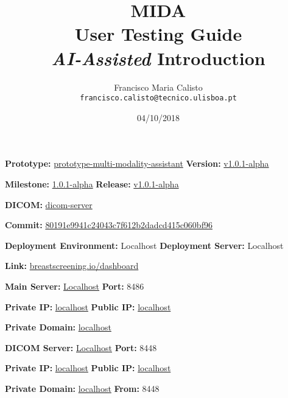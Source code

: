\documentclass{article}
\title{
MIDA
\\
User Testing Guide
\\
\textit{AI-Assisted} Introduction
}
\author{
Francisco Maria Calisto\\
\texttt{francisco.calisto@tecnico.ulisboa.pt}
}
\date{04/10/2018}
\begin{document}
\maketitle

\textbf{Prototype:} \hyperlink{https://github.com/mida-project/prototype-multi-modality-assistant}{prototype-multi-modality-assistant} \hfill \textbf{Version:} \hyperlink{https://github.com/mida-project/prototype-multi-modality-assistant/tree/9a912aea8d156f53e846b15bb29a09fc046bd731}{v1.0.1-alpha}

\textbf{Milestone:} \hyperlink{https://github.com/mida-project/prototype-multi-modality-assistant/milestone/1}{1.0.1-alpha} \hfill \textbf{Release:} \hyperlink{https://github.com/mida-project/prototype-multi-modality-assistant/releases/tag/v1.0.1-alpha}{v1.0.1-alpha}

\hfill

\textbf{DICOM:} \hyperlink{https://github.com/MIMBCD-UI/dicom-server}{dicom-server}

\textbf{Commit:} \hyperlink{https://github.com/MIMBCD-UI/dicom-server/tree/80191e9941c24043c7f612b2dadcd415c060bf96}{80191e9941c24043c7f612b2dadcd415c060bf96}

\hfill

\textbf{Deployment Environment:} Localhost \hfill \textbf{Deployment Server:} Localhost

\textbf{Link:} \hyperlink{http://www.breastscreening.io/dashboard/}{breastscreening.io/dashboard}

\hfill

\textbf{Main Server:} \hyperlink{http://localhost:8486/src/public/index.html}{Localhost} \hfill \textbf{Port:} 8486

\textbf{Private IP:} \hyperlink{http://localhost:8486/src/public/index.html}{localhost} \hfill \textbf{Public IP:} \hyperlink{http://localhost:8486/src/public/index.html}{localhost}

\textbf{Private Domain:} \hyperlink{http://localhost:8486/src/public/index.html}{localhost}

\hfill

\textbf{DICOM Server:} \hyperlink{http://localhost:8448/app/explorer.html}{Localhost} \hfill \textbf{Port:} 8448

\textbf{Private IP:} \hyperlink{http://localhost:8448/app/explorer.html}{localhost} \hfill \textbf{Public IP:} \hyperlink{http://localhost:8448/app/explorer.html}{localhost}

\textbf{Private Domain:} \hyperlink{http://localhost:8448/app/explorer.html}{localhost} \hfill \textbf{From:} 8448

\clearpage











\clearpage



\end{document}
